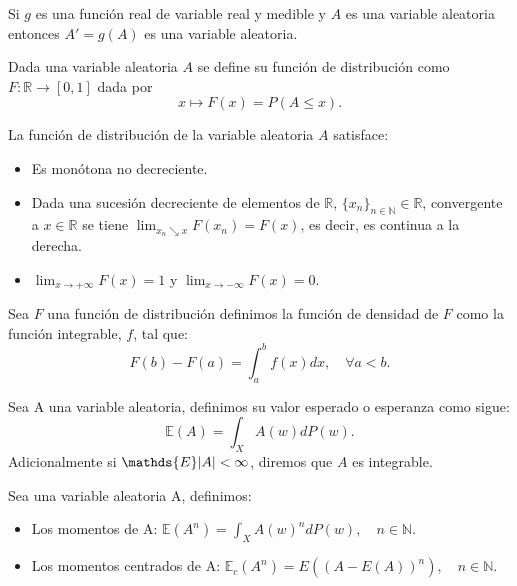 \documentclass[../proyecto.tex]{memoir}
\begin{document}
\begin{prop} \label{funcion_de_va}
Si $g$ es una función real de variable real y medible y $A$ es una variable aleatoria entonces $A'=g(A)$ es una variable aleatoria.
\end{prop}

\begin{defi}
Dada una variable aleatoria $A$ se define su función de distribución como $ F : \mathds{R} \rightarrow [0,1] $ dada por 
$$
x \mapsto F(x)=P(A \leq x).
$$
\end{defi}

\begin{prop}
La función de distribución de la variable aleatoria $A$ satisface:
\begin{itemize}
\item Es monótona no decreciente.
\item Dada una sucesión decreciente de elementos de $\mathds{R}$, $\{x_n\}_{n \in \mathds{N}} \in \mathds{R}$, convergente a $x\in \mathds{R}$ se tiene $\lim_{x_n \searrow x} F(x_n) = F(x)$, es decir, es continua a la derecha. 
\item $\lim_{x\to+\infty} F(x) = 1$ y $\lim_{x\to-\infty} F(x) = 0$.
\end{itemize}
\end{prop}

\begin{defi}
Sea $F$ una función de distribución definimos la función de densidad de $F$ como la función integrable, $f$, tal que:
$$
F(b)-F(a) = \int^{b}_a f(x) dx, \quad \forall a < b. 
$$
\end{defi}

\begin{defi}
Sea A una variable aleatoria, definimos su valor esperado o esperanza como sigue:
$$
\mathds{E}(A) = \int_{X}A(w)dP(w).
$$
Adicionalmente si $\mathds{E}\abs{A} < \infty$, diremos que $A$ es integrable.
\end{defi}

\begin{defi}
Sea una variable aleatoria A, definimos:
\begin{itemize}
\item Los momentos de A: $\mathds{E}(A^n) = \int_{X}A(w)^{n}dP(w), \quad n \in \mathds{N}$.
\item Los momentos centrados de A: $\mathds{E}_c(A^n) = E( (A-E(A))^n ), \quad n \in \mathds{N}$.
\end{itemize}
\end{defi}
\end{document}
